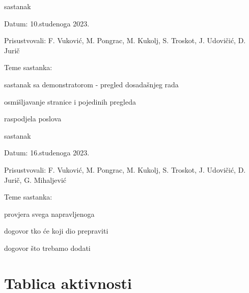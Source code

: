 \begin{packed_enum}
			\item  sastanak
			\item[] \begin{packed_item}
				\item Datum: 10.studenoga 2023.
				\item Prisustvovali: F. Vuković, M. Pongrac, M. Kukolj, S. Troskot, J. Udovičić, D. Jurič
				\item Teme sastanka:
				\begin{packed_item}
					\item  sastanak sa demonstratorom - pregled dosadašnjeg rada
					\item  osmišljavanje stranice i pojedinih pregleda
					\item raspodjela poslova 
				\end{packed_item}
			\end{packed_item}

			\item  sastanak
			\item[] \begin{packed_item}
				\item Datum: 16.studenoga 2023.
				\item Prisustvovali: F. Vuković, M. Pongrac, M. Kukolj, S. Troskot, J. Udovičić, D. Jurič, G. Mihaljević
				\item Teme sastanka:
				\begin{packed_item}
					\item  provjera svega napravljenoga
					\item dogovor tko će koji dio prepraviti 
					\item dogovor što trebamo dodati
				\end{packed_item}
			\end{packed_item}

			
		\end{packed_enum}
		
		\eject
		\section*{Tablica aktivnosti}
		
